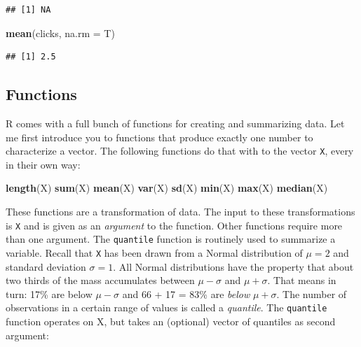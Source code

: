 \documentclass[]{svmono}
\newenvironment{Shaded}{\begin{snugshade}}{\end{snugshade}}
\newcommand{\KeywordTok}[1]{\textcolor[rgb]{0.13,0.29,0.53}{\textbf{#1}}}
\newcommand{\DataTypeTok}[1]{\textcolor[rgb]{0.13,0.29,0.53}{#1}}
\newcommand{\NormalTok}[1]{#1}
\begin{document}
\begin{verbatim}
## [1] NA
\end{verbatim}

\begin{Shaded}
\begin{Highlighting}[]
\KeywordTok{mean}\NormalTok{(clicks, }\DataTypeTok{na.rm =}\NormalTok{ T)}
\end{Highlighting}
\end{Shaded}

\begin{verbatim}
## [1] 2.5
\end{verbatim}

\subsection{Functions}\label{functions}

R comes with a full bunch of functions for creating and summarizing
data. Let me first introduce you to functions that produce exactly one
number to characterize a vector. The following functions do that with to
the vector \texttt{X}, every in their own way:

\begin{Shaded}
\begin{Highlighting}[]
\KeywordTok{length}\NormalTok{(X)}
\KeywordTok{sum}\NormalTok{(X)}
\KeywordTok{mean}\NormalTok{(X)}
\KeywordTok{var}\NormalTok{(X)}
\KeywordTok{sd}\NormalTok{(X)}
\KeywordTok{min}\NormalTok{(X)}
\KeywordTok{max}\NormalTok{(X)}
\KeywordTok{median}\NormalTok{(X)}
\end{Highlighting}
\end{Shaded}

These functions are a transformation of data. The input to these
transformations is \texttt{X} and is given as an \emph{argument} to the
function. Other functions require more than one argument. The
\texttt{quantile} function is routinely used to summarize a variable.
Recall that \texttt{X} has been drawn from a Normal distribution of
\(\mu=2\) and standard deviation \(\sigma = 1\). All Normal
distributions have the property that about two thirds of the mass
accumulates between \(\mu-\sigma\) and \(\mu+\sigma\). That means in
turn: 17\% are below \(\mu-\sigma\) and 66 + 17 = 83\% are \emph{below}
\(\mu+\sigma\). The number of observations in a certain range of values
is called a \emph{quantile}. The \texttt{quantile} function operates on
X, but takes an (optional) vector of quantiles as second argument:
\end{document}
